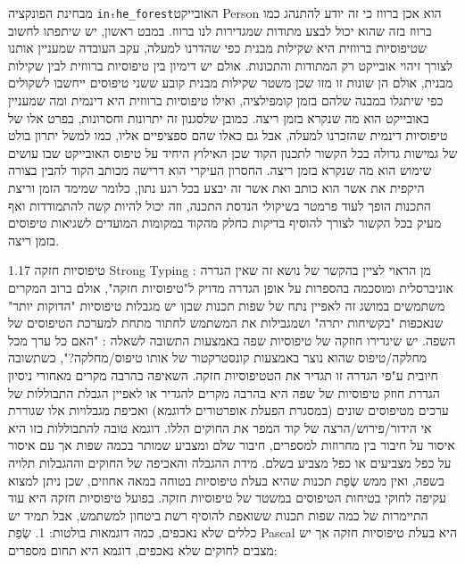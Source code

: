 \begin{טבלא}[!htbp]
      מבחינת הפונקציה \verb+inₜhe_forest+האובייקט Person הוא אכן ברווז כי זה
      יודע להתנהג כמו ברווז בזה שהוא יכול לבצע מתודות שמגדירות לנו ברווז. במבט
      ראשון, יש שיתפתו לחשוב שטיפוסיות ברווזית היא שקילות מבנית כפי שהדרנו
      למעלה, עקב העובדה שמעניין אותנו לצורך זיהוי אובייקט רק המתודות והתכונות.
      אולם יש דימיון בין טיפוסיות ברווזית לבין שקילות מבנית, אולם הן שונות זו
      מזו שכן משטר שקילות מבנית קובע ששני טיפוסים ייחשבו לשקולים כפי שיתגלו
      במבנה שלהם בזמן קומפילציה, ואילו טיפוסיות ברווזית היא דינמית ומה שמעניין
      באובייקט הוא מה שנקרא בזמן ריצה. כמובן שלסגנון זה יתרונות וחסרונות, בפרט
      אלו של טיפוסיות דינמית שהזכרנו למעלה, אבל גם כאלו שהם ספציפיים אליו, כמו
      למשל יתרון בולט של גמישות גדולה בכל הקשור לתכנון הקוד שכן האילוץ היחיד על
      טיפוס האובייקט שבו עושים שימוש הוא מה שנקרא בזמן ריצה. החסרון העיקרי הוא
      דרישה מכותב הקוד להבין בצורה היקפית את אשר הוא כותב ואת אשר זה יבצע בכל
      רגע נתון, כלומר שמימד הזמן וריצת התכנות הופך לעוד פרמטר בשיקולי הנדסת
      התכנה, וזה יכול להיות קשה להתמודדות ואף מעיק בכל הקשור לצורך להוסיף
      בדיקות כחלק מהקוד במקומות המועדים לשגיאות טיפוסים בזמן ריצה.

      1.17 טיפוסיות חזקה Strong Typing : מן הראוי לציין בהקשר של נושא זה שאין
      הגדרה אוניברסלית ומוסכמה בהספרות על אופן הגדרה מדויק ל"טיפוסיות חזקה",
      אולם ברוב המקרים משתמשים במושג זה לאפיין נתח של שפות תכנות שבןו יש מגבלות
      טיפוסיות "הדוקות יותר" שנאכפות "בקשיחות יתרה" ושמגבילות את המשתמש לחתור
      מתחת למערכת הטיפוסים של השפה. יש שיגדירו חוזקה של טיפוסיות שפה באמצעות
      התשובה לשאלה : "האם כל ערך מכל מחלקה/טיפוס שהוא נוצר באמצעות קונסטרקטור
      של אותו טיפוס/מחלקה?", כשתשובה חיובית ע"פי הגדרה זו תגדיר את הטטיפוסיות
      חזקה. השאיפה בהרבה מקרים מאחורי ניסיון הגדרת חוזק טיפוסיות של שפה היא
      בהרבה מקרים להגדיר או לאפיין הגבלת התבוללות של ערכים מטיפוסים שונים
      (במסגרת הפעלת אופרטורים לדוגמא) ואכיפת מגבלויות אלו שגוררת אי
      הידור/פירוש/הרצה של קוד המפר את החוקים הללו.
      דוגמא טובה להתבוללות כזו היא איסור על חיבור בין מחרוזות למספרים, חיבור שלם ומצביע שמותר בכמה שפות אך עם איסור על כפל מצביעים או כפל מצביע בשלם.
      מידת ההגבלה והאכיפה של החוקים וההגבלות תלויה בשפה, ואין ממש שְׂפַת תכנות שהיא בעלת טיפוסיות בטוחה במאה אחוזים, שכן ניתן למצוא עקיפה לחוקי בטיחות הטיפוסים במשטר של טיפוסיות חזקה.
      בפועל טיפוסיות חזקה היא עוד התיימרות של כמה שפות תכנות ששואפת להוסיף רשת ביטחון למשתמש, אבל תמיד יש כללים שלא נאכפים, כמה דוגמאות בולטות:
      1. שְׂפַת Pascal היא בעלת טיפוסיות חזקה אך יש מצבים לחוקים שלא נאכפים, דוגמא היא תחום מספרים:


\end{טבלא}
